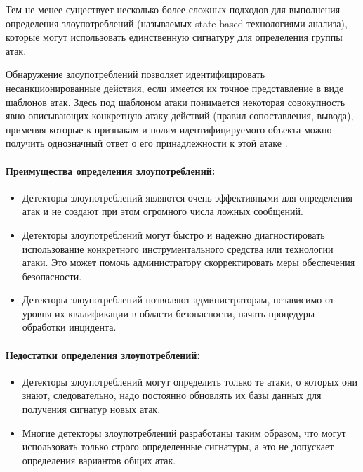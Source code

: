 Тем не менее существует несколько более сложных подходов для выполнения определения злоупотреблений (называемых state-based технологиями анализа), которые могут использовать единственную сигнатуру для определения группы атак.


Обнаружение злоупотреблений позволяет идентифицировать несанкционированные действия, если имеется их точное представление в виде шаблонов атак. Здесь под шаблоном атаки понимается некоторая совокупность явно описывающих конкретную атаку действий (правил сопоставления, вывода), применяя которые к признакам и полям идентифицируемого объекта можно получить однозначный ответ о его принадлежности к этой атаке \autocite{IDSBranitsky}.

\paragraph*{Преимущества определения злоупотреблений:}

\begin{itemize}
	\item Детекторы злоупотреблений являются очень эффективными для определения атак и не создают при этом огромного числа ложных сообщений.

	\item Детекторы злоупотреблений могут быстро и надежно диагностировать использование конкретного инструментального средства или технологии атаки. Это может помочь администратору скорректировать меры обеспечения безопасности.
	
	\item Детекторы злоупотреблений позволяют администраторам, независимо от уровня их квалификации в области безопасности, начать процедуры обработки инцидента.
\end{itemize}


\paragraph*{Недостатки определения злоупотреблений:}

\begin{itemize}
	\item Детекторы злоупотреблений могут определить только те атаки, о которых они знают, следовательно, надо постоянно обновлять их базы данных для получения сигнатур новых атак.

	\item Многие детекторы злоупотреблений разработаны таким образом, что могут использовать только строго определенные сигнатуры, а это не допускает определения вариантов общих атак.
\end{itemize}

